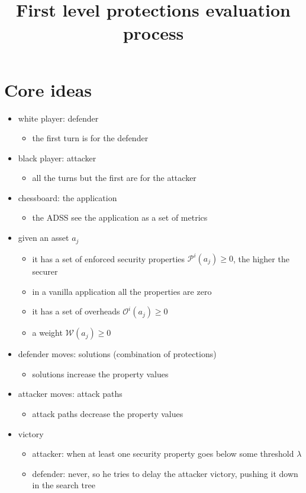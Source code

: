 \documentclass[9pt]{scrartcl}
\title{First level protections evaluation process}
\author{}
\date{}
\newcommand{\Property}[2]{\mathcal{P}^{#1}(#2)}
\newcommand{\Overheadd}[2]{\mathcal{O}^{#1}(#2)}
\newcommand{\Weight}[1]{\mathcal{W}(#1)}
\newcommand{\Threshold}{\lambda}
\begin{document}
	\maketitle

\section*{Core ideas}

\begin{itemize}
	\item white player: defender
	\begin{itemize}
		\item the first turn is for the defender
	\end{itemize}
	\item black player: attacker
	\begin{itemize}
		\item all the turns but the first are for the attacker
	\end{itemize}
	\item chessboard: the application
	\begin{itemize}
		\item the ADSS see the application as a set of metrics
	\end{itemize}
	\item given an asset $a_j$
	\begin{itemize}
		\item it has a set of enforced security properties $\Property{i}{a_j} \ge 0$, the higher the securer
		\item in a vanilla application all the properties are zero
		\item it has a set of overheads $\Overheadd{i}{a_j} \ge 0$
		\item a weight $\Weight{a_j} \ge 0$
	\end{itemize}
	\item defender moves: solutions (combination of protections)
	\begin{itemize}
		\item solutions increase the property values
	\end{itemize}
	\item attacker moves: attack paths
	\begin{itemize}
		\item attack paths decrease the property values
	\end{itemize}
	\item victory
	\begin{itemize}
		\item attacker: when at least one security property goes below some threshold $\Threshold$
		\item defender: never, so he tries to delay the attacker victory, pushing it down in the search tree
	\end{itemize}
\end{itemize}
\end{document}
